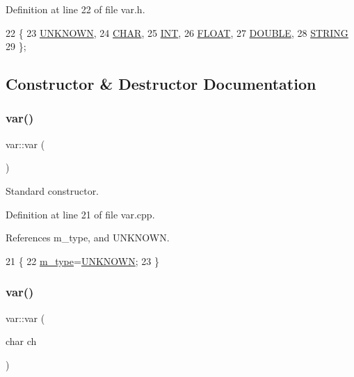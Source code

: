 Definition at line 22 of file var.\+h.


\begin{DoxyCode}
22             \{
23     \hyperlink{classvar_ae4f9e2c747c3e72f245b148146b1855ea0f04795086058cdfd618ce292cc10f7b}{UNKNOWN},
24     \hyperlink{classvar_ae4f9e2c747c3e72f245b148146b1855eae9bfb9b218ebe0917ff49ad2dc74eea8}{CHAR},
25     \hyperlink{classvar_ae4f9e2c747c3e72f245b148146b1855eae8b4ab776b56b78d2f219c9666e6ffbf}{INT},
26     \hyperlink{classvar_ae4f9e2c747c3e72f245b148146b1855ead10e07906d918cec495207e33b00256a}{FLOAT},
27     \hyperlink{classvar_ae4f9e2c747c3e72f245b148146b1855ea645fb8aa32f88e2b580ab65fe3a0a234}{DOUBLE},
28     \hyperlink{classvar_ae4f9e2c747c3e72f245b148146b1855ea7a154d7312f6d12c9031819ad3dfef71}{STRING}
29   \};
\end{DoxyCode}


\subsection{Constructor \& Destructor Documentation}
\mbox{\label{classvar_af87bf2817f89678071ac7588a85a7f36}} 
\subsubsection{\texorpdfstring{var()}{var()}\hspace{0.1cm}{\footnotesize\ttfamily [1/6]}}
{\footnotesize\ttfamily var\+::var (\begin{DoxyParamCaption}{ }\end{DoxyParamCaption})}



Standard constructor. 



Definition at line 21 of file var.\+cpp.



References m\+\_\+type, and U\+N\+K\+N\+O\+WN.


\begin{DoxyCode}
21            \{
22   \hyperlink{classvar_afd0bde61955d8a7541d3dcedc22ec2ad}{m\_type}=\hyperlink{classvar_ae4f9e2c747c3e72f245b148146b1855ea0f04795086058cdfd618ce292cc10f7b}{UNKNOWN};
23 \}
\end{DoxyCode}
\mbox{\label{classvar_a4afcdfc96cfac4b68e92415698f7e9de}} 
\subsubsection{\texorpdfstring{var()}{var()}\hspace{0.1cm}{\footnotesize\ttfamily [2/6]}}
{\footnotesize\ttfamily var\+::var (\begin{DoxyParamCaption}\item[{char}]{ch }\end{DoxyParamCaption})}



